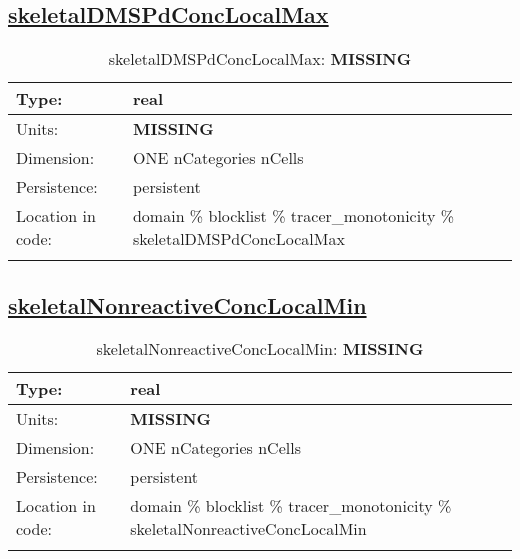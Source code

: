 \subsection[skeletalDMSPdConcLocalMax]{\hyperref[sec:var_tab_tracer_monotonicity]{skeletalDMSPdConcLocalMax}}
\label{subsec:var_sec_tracer_monotonicity_skeletalDMSPdConcLocalMax}
\begin{center}
\begin{longtable}{| p{2.0in} | p{4.0in} |}
        \hline 
        Type: & real \\
        \hline 
        Units: & {\bf \color{red} MISSING} \\
        \hline 
        Dimension: & ONE nCategories nCells \\
        \hline 
        Persistence: & persistent \\
        \hline 
         Location in code: & domain \% blocklist \% tracer\_monotonicity \% skeletalDMSPdConcLocalMax \\
         \hline 
    \caption{skeletalDMSPdConcLocalMax: {\bf \color{red} MISSING}}
\end{longtable}
\end{center}
\subsection[skeletalNonreactiveConcLocalMin]{\hyperref[sec:var_tab_tracer_monotonicity]{skeletalNonreactiveConcLocalMin}}
\label{subsec:var_sec_tracer_monotonicity_skeletalNonreactiveConcLocalMin}
\begin{center}
\begin{longtable}{| p{2.0in} | p{4.0in} |}
        \hline 
        Type: & real \\
        \hline 
        Units: & {\bf \color{red} MISSING} \\
        \hline 
        Dimension: & ONE nCategories nCells \\
        \hline 
        Persistence: & persistent \\
        \hline 
         Location in code: & domain \% blocklist \% tracer\_monotonicity \% skeletalNonreactiveConcLocalMin \\
         \hline 
    \caption{skeletalNonreactiveConcLocalMin: {\bf \color{red} MISSING}}
\end{longtable}
\end{center}
